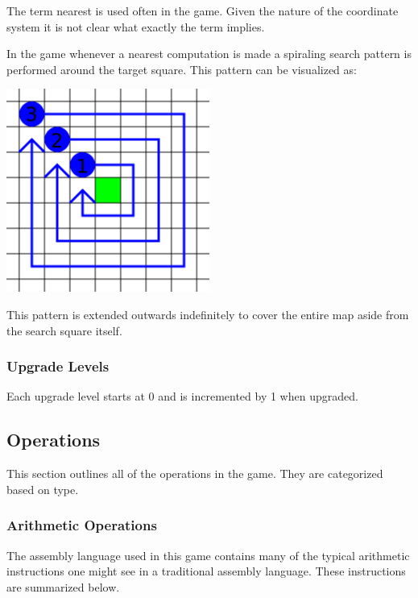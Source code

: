 \documentclass{article}
\begin{document}
The term nearest is used often in the game. Given the nature of the coordinate
system it is not clear what exactly the term implies.

In the game whenever a nearest computation is made a spiraling search pattern is
performed around the target square. This pattern can be visualized as:

{\centering\includegraphics[width=0.5\textwidth]{res/nearest.png}\par}

This pattern is extended outwards indefinitely to cover the entire map aside
from the search square itself.

\subsubsection{Upgrade Levels}

Each upgrade level starts at 0 and is incremented by 1 when upgraded.

\subsection{Operations}

This section outlines all of the operations in the game. They are categorized
based on type.

\subsubsection{Arithmetic Operations}

The assembly language used in this game contains many of the typical
arithmetic instructions one might see in a traditional assembly language. These
instructions are summarized below.
\end{document}

